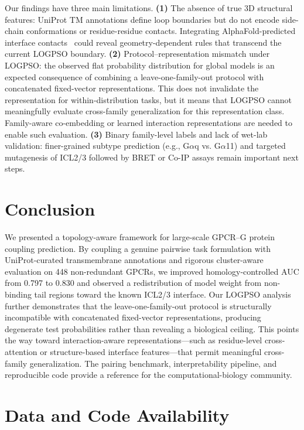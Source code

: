 \documentclass[11pt,a4paper]{article}
\begin{document}
Our findings have three main limitations. \textbf{(1)} The absence of true 3D structural features: UniProt TM annotations define loop boundaries but do not encode side-chain conformations or residue-residue contacts. Integrating AlphaFold-predicted interface contacts~\cite{jumper2021highly} could reveal geometry-dependent rules that transcend the current LOGPSO boundary. \textbf{(2)} Protocol--representation mismatch under LOGPSO: the observed flat probability distribution for global models is an expected consequence of combining a leave-one-family-out protocol with concatenated fixed-vector representations. This does not invalidate the representation for within-distribution tasks, but it means that LOGPSO cannot meaningfully evaluate cross-family generalization for this representation class. Family-aware co-embedding or learned interaction representations are needed to enable such evaluation. \textbf{(3)} Binary family-level labels and lack of wet-lab validation: finer-grained subtype prediction (e.g., G$\alpha$q vs. G$\alpha$11) and targeted mutagenesis of ICL2/3 followed by BRET or Co-IP assays remain important next steps.

\section{Conclusion}

We presented a topology-aware framework for large-scale GPCR--G protein coupling prediction. By coupling a genuine pairwise task formulation with UniProt-curated transmembrane annotations and rigorous cluster-aware evaluation on 448 non-redundant GPCRs, we improved homology-controlled AUC from 0.797 to 0.830 and observed a redistribution of model weight from non-binding tail regions toward the known ICL2/3 interface. Our LOGPSO analysis further demonstrates that the leave-one-family-out protocol is structurally incompatible with concatenated fixed-vector representations, producing degenerate test probabilities rather than revealing a biological ceiling. This points the way toward interaction-aware representations---such as residue-level cross-attention or structure-based interface features---that permit meaningful cross-family generalization. The pairing benchmark, interpretability pipeline, and reproducible code provide a reference for the computational-biology community.

\section*{Data and Code Availability}
\end{document}
